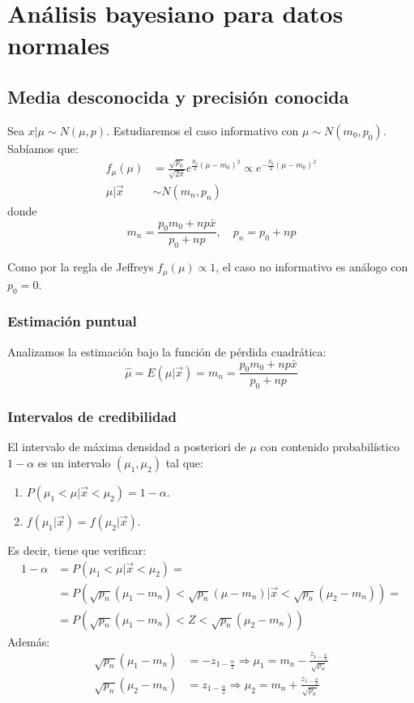 \section{Análisis bayesiano para datos normales}
\subsection*{Media desconocida y precisión conocida}
Sea $x|\mu \sim N(\mu, p)$.
Estudiaremos el caso informativo con $\mu \sim N(m_0, p_0)$.
Sabíamos que:
\begin{align*}
    f_\mu(\mu)  & = \frac{\sqrt{p_0}}{\sqrt{2\pi}} e^{\frac{p_0}{2}(\mu-m_0)^2} \propto e^{-\frac{p_0}{2}(\mu-m_0)^2} \\
    \mu|\vec{x} & \sim N(m_n, p_n)
\end{align*}
donde
$$m_n = \frac{p_0m_0+np\bar{x}}{p_0+np}, \quad p_n = p_0+np$$

Como por la regla de Jeffreys $f_\mu(\mu) \propto 1$, el caso no informativo es análogo con $p_0 = 0$.

\subsubsection*{Estimación puntual}
Analizamos la estimación bajo la función de pérdida cuadrática:
$$\hat{\mu} = E(\mu|\vec{x}) = m_n = \frac{p_0m_0+np\bar{x}}{p_0+np}$$

\subsubsection*{Intervalos de credibilidad}
El intervalo de máxima densidad a posteriori de $\mu$ con contenido probabilístico $1-\alpha$ es un intervalo $(\mu_1, \mu_2)$ tal que:
\begin{enumerate}
    \item $P(\mu_1 < \mu|\vec{x} < \mu_2) = 1-\alpha$.
    \item $f(\mu_1|\vec{x}) = f(\mu_2|\vec{x})$.
\end{enumerate}

Es decir, tiene que verificar:
\begin{align*}
    1-\alpha & = P(\mu_1 < \mu|\vec{x} < \mu_2) =                                                 \\
             & = P(\sqrt{p_n}(\mu_1-m_n) < \sqrt{p_n}(\mu-m_n)|\vec{x} < \sqrt{p_n}(\mu_2-m_n)) = \\
             & = P(\sqrt{p_n}(\mu_1-m_n) < Z < \sqrt{p_n}(\mu_2-m_n))
\end{align*}
Además:
\begin{align*}
    \sqrt{p_n}(\mu_1-m_n) & = -z_{1-\frac{\alpha}{2}} \Rightarrow \mu_1 = m_n - \frac{z_{1-\frac{\alpha}{2}}}{\sqrt{p_n}} \\
    \sqrt{p_n}(\mu_2-m_n) & = z_{1-\frac{\alpha}{2}} \Rightarrow \mu_2 = m_n + \frac{z_{1-\frac{\alpha}{2}}}{\sqrt{p_n}}
\end{align*}

